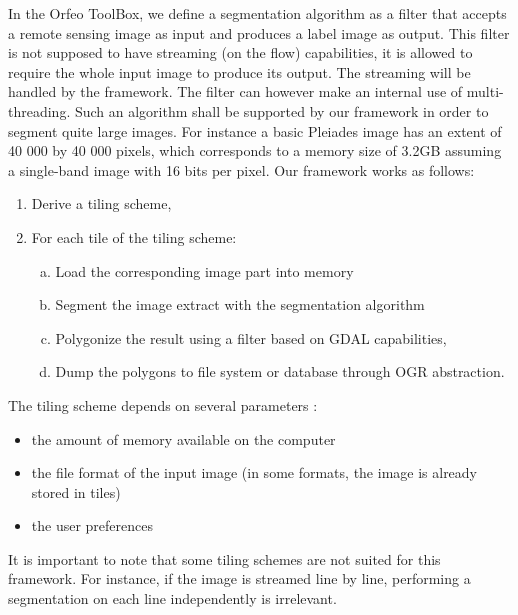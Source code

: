 \documentclass{josis}
\begin{document}
In the Orfeo ToolBox, we define a segmentation algorithm as a filter
that accepts a remote sensing image as input and produces a label
image as output. This filter is not supposed to have streaming (on the
flow) capabilities, it is allowed to require the whole input image to
produce its output. The streaming will be handled by the framework. The
filter can however make an internal use of multi-threading.
Such an algorithm shall be supported by our framework in order to
segment quite large images. For instance a basic Pleiades image
\cite{} has an extent of 40 000 by 40 000 pixels, which corresponds to
a memory size of 3.2GB assuming a single-band image with 16 bits per pixel.
Our framework works as follows:
\begin{enumerate}[1)]
\item Derive a tiling scheme,
\item For each tile of the tiling scheme:
\begin{enumerate}[a)]
\item Load the corresponding image part into memory
\item Segment the image extract with the segmentation algorithm
\item Polygonize the result using a filter based on GDAL capabilities,
\item Dump the polygons to file system or database through OGR
      abstraction.
\end{enumerate}
\end{enumerate}

The tiling scheme depends on several parameters :
\begin{itemize}
\item the amount of memory available on the computer
\item the file format of the input image (in some formats,
the image is already stored in tiles)
\item the user preferences
\end{itemize}
It is important to note that some tiling schemes are not suited for this
framework. For instance, if the image is streamed line by line, performing
a segmentation on each line independently is irrelevant.
\end{document}
